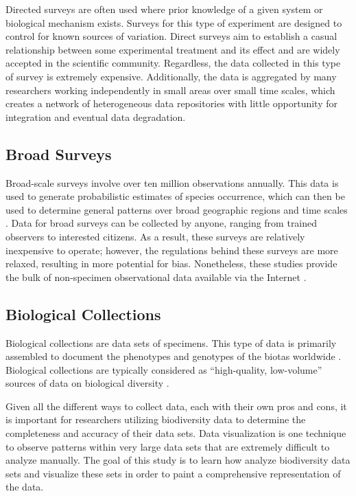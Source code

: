 Directed surveys are often used where prior knowledge of a given system or biological mechanism exists.
Surveys for this type of experiment are designed to control for known sources of variation\cite {GBIFbirds}.
Direct surveys aim to establish a casual relationship between some experimental treatment and its effect and are widely accepted in the scientific community.
Regardless, the data collected in this type of survey is extremely expensive.
Additionally, the data is aggregated by many researchers working independently in small areas over small time scales, which creates a network of heterogeneous data repositories with little opportunity for integration and eventual data degradation.

\subsection{Broad  Surveys}

Broad-scale surveys involve over ten million observations annually.
This data is used to generate probabilistic estimates of species occurrence, which can then be used to determine general patterns over broad geographic regions and time scales \cite {GBIFbirds}.
Data for broad surveys can be collected by anyone, ranging from trained observers to interested citizens.
As a result, these surveys are relatively inexpensive to operate; however, the regulations behind these surveys are more relaxed, resulting in more potential for bias.
Nonetheless, these studies provide the bulk of non-specimen observational data available via the Internet \cite {SP}.

\subsection{Biological Collections}

Biological collections are data sets of specimens.
This type of data is primarily assembled to document the phenotypes and genotypes of the biotas worldwide \cite{Barve}.
Biological collections are typically considered as ``high-quality, low-volume'' sources of data on biological diversity \cite{Barve}.

Given all the different ways to collect data, each with their own pros and cons, it is important for researchers utilizing biodiversity data to determine the completeness and accuracy of their data sets.
Data visualization is one technique to observe patterns within very large data sets that are extremely difficult to analyze manually.
The goal of this study is to learn how analyze biodiversity data sets and visualize these sets in order to paint a comprehensive representation of the data.

